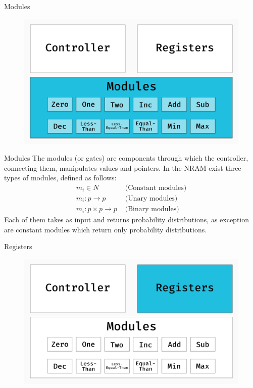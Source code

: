 \documentclass[xcolor={usenames}]{beamer}
\begin{document}
  \begin{frame}{Modules}
  	\begin{figure}
  		\centering
  		\includegraphics[width=\textwidth]{../figures/schema-nram-without-memory-MS.png}
  	\end{figure}
  \end{frame}
  \begin{frame}{Modules}
  	The modules (or gates) are components through which the controller, connecting them, manipulates values and pointers. In the NRAM exist three types of modules, defined as follows:
  	\begin{align}
		m_i \in N & \textrm{ (Constant modules)} \\
		m_i: p \rightarrow p & \textrm{ (Unary modules)} \\
		m_i: p \times p \rightarrow p & \textrm{ (Binary modules)}
	\end{align}
	Each of them takes as input and returns probability distributions, as exception are constant modules which return only probability distributions.
  \end{frame}
  \begin{frame}{Registers}
  	\begin{figure}
  		\centering
  		\includegraphics[width=\textwidth]{../figures/schema-nram-without-memory-RS.png}
  	\end{figure}
  \end{frame}
\end{document}
